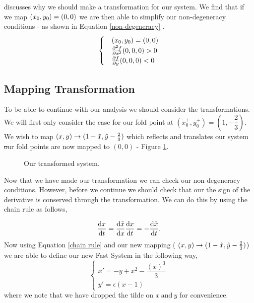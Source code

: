 
\citet{krupa2001} discusses why we should make a transformation for our system. We find that if we map $(x_0,y_0)=(0,0)$ we are then able to simplify our non-degeneracy conditions - as shown in Equation \ref{non-degeneracy} \citep{krupa2001}.
\begin{equation}
    \begin{cases}
        &\folds=(0,0)\\
        &\pd{^2f}{x^2}(0,0,0)>0\\
        &\pd{f}{y}(0,0,0)<0
    \end{cases} 
    \label{non-degeneracy}
\end{equation}

\subsection{Mapping Transformation}\label{sex: mapping}
To be able to continue with our analysis we should consider the transformations. We will first only consider the case for our fold point at $(x_0^+,y_0^+)=(1,-\dfrac{2}{3})$. We wish to map $(x,y)\to (1-\Tilde{x},\Tilde{y}-\frac{2}{3})$ which reflects and translates our system \st our fold points are now mapped to $(0,0)$ - Figure \ref{fig: Transformed System}. 

\begin{figure}[h]
    \centering
    \caption{Our transformed system.}
    \label{fig: Transformed System}
\end{figure}
Now that we have made our transformation we can check our non-degeneracy conditions. However, before we continue we should check that our the sign of the derivative is conserved through the transformation. We can do this by using the chain rule as follows, 

\begin{equation}
    \od{x}{t}=\od{\Tilde{x}}{x}\od{x}{t}=-\od{\Tilde{x}}{t}. \label{chain rule}
\end{equation}
Now using Equation \ref{chain rule} and our new mapping ( $(x,y)\to (1-\Tilde{x},\Tilde{y}-\frac{2}{3})$) we are able to define our new Fast System in the following way, 
\begin{equation}
    \begin{cases}
        x'=-y+x^2-\dfrac{(x)^3}{3}\\
        y'=\epsilon(x-1)
    \end{cases}
    \label{eq: Fast System}
\end{equation}
where we note that we have dropped the tilde on $x \ \text{and} \ y$ for convenience. \\

